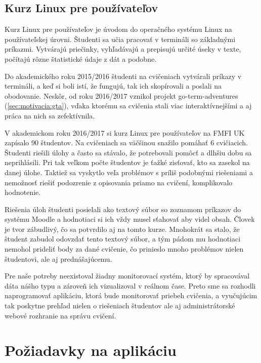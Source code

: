 \subsection{Kurz Linux pre používateľov}
\label{sec:motivacia:linuxforusers}

Kurz Linux pre používateľov je úvodom do operačného systému Linux
na používateľskej úrovni. Študenti sa učia pracovať v termináli so základnými
príkazmi. Vytvárajú priečinky, vyhľadávajú a prepisujú určité úseky v texte,
počítajú rôzne štatistické údaje z dát a podobne.

Do akademického roku 2015/2016 študenti na cvičeniach vytvárali príkazy v
termináli, a keď si boli istí, že fungujú, tak ich skopírovali a poslali na obodovanie.
Neskôr, od roku 2016/2017 vznikol projekt go-term-adventures (\ref{sec:motivacia:gta}), vďaka ktorému sa
cvičenia stali viac interaktívnejšími a aj práca na nich sa zefektívnila.

V akademickom roku 2016/2017 si kurz Linux pre používateľov na FMFI UK zapísalo
90 študentov. Na cvičeniach sa väčšinou snažilo pomáhať 6 cvičiacich. Študenti riešili
úlohy a často sa stávalo, že potrebovali pomôcť a dlhšiu dobu sa neprihlásili.
Pri tak veľkom počte študentov je ťažké zisťovať, kto sa zasekol na danej úlohe.
Taktiež sa vyskytlo veľa problémov s príliš podobnými riešeniami a nemožnosť riešiť podozrenie z opisovania priamo na cvičení, komplikovalo hodnotenie.

Riešenia úloh študenti posielali ako textový súbor so zoznamom príkazov do systému
Moodle a hodnotiaci si ich vždy musel sťahovať aby videl obsah. Človek je
tvor zábudlivý, čo sa potvrdilo aj na tomto kurze. Mnohokrát sa stalo, že študent
zabudol odovzdať tento textový súbor, a tým pádom mu hodnotiaci nemohol prideliť
body za dané cvičenie, čo prinieslo mnoho problémov nielen študentovi, ale aj
prednášajúcemu.

Pre naše potreby neexistoval žiadny monitorovací systém, ktorý by spracovával
dáta nášho typu a zároveň ich vizualizoval v reálnom čase. 
Preto sme sa rozhodli naprogramovať aplikáciu, ktorá bude
monitorovať priebeh cvičenia, a vyučujúcim tak poskytne prehľad nielen o riešeniach
študentov ale aj administrátorské webové rozhranie na správu cvičení.

\section{Požiadavky na aplikáciu}
\label{sec:apprequirements}

